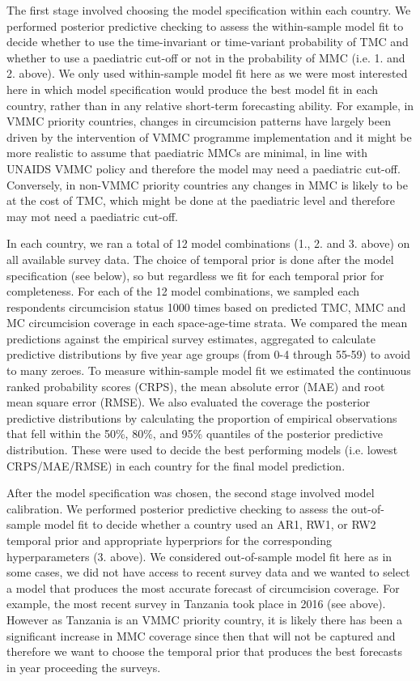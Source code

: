 \documentclass{article}
\begin{document}
\begin{appendix}
The first stage involved choosing the model specification within each country. We performed posterior predictive checking to assess the within-sample model fit to decide whether to use the time-invariant or time-variant probability of TMC and whether to use a paediatric cut-off or not in the probability of MMC (i.e. 1. and 2. above). We only used within-sample model fit here as we were most interested here in which model specification would produce the best model fit in each country, rather than in any relative short-term forecasting ability. For example, in VMMC priority countries, changes in circumcision patterns have largely been driven by the intervention of VMMC programme implementation and it might be more realistic to assume that paediatric MMCs are minimal, in line with UNAIDS VMMC policy and therefore the model may need a paediatric cut-off. Conversely, in non-VMMC priority countries any changes in MMC is likely to be at the cost of TMC, which might be done at the paediatric level and therefore may mot need a paediatric cut-off. 

In each country, we ran a total of 12 model combinations (1., 2. and 3. above) on all available survey data. The choice of temporal prior is done after the model specification (see below), so but regardless we fit for each temporal prior for completeness. For each of the 12 model combinations, we sampled each respondents circumcision status 1000 times based on predicted TMC, MMC and MC circumcision coverage in each space-age-time strata. We compared the mean predictions against the empirical survey estimates, aggregated to calculate predictive distributions by five year age groups (from 0-4 through 55-59) to avoid to many zeroes. To measure within-sample model fit we estimated the continuous ranked probability scores (CRPS), the mean absolute error (MAE) and root mean square error (RMSE). We also evaluated the coverage the posterior predictive distributions by calculating the proportion of empirical observations that fell within the 50\%, 80\%, and 95\% quantiles of the posterior predictive distribution. These were used to decide the best performing models (i.e. lowest CRPS/MAE/RMSE) in each country for the final model prediction. 

After the model specification was chosen, the second stage involved model calibration. We performed posterior predictive checking to assess the out-of-sample model fit to decide whether a country used an AR1, RW1, or RW2 temporal prior and appropriate hyperpriors for the corresponding hyperparameters (3. above). We considered out-of-sample model fit here as in some cases, we did not have access to recent survey data and we wanted to select a model that produces the most accurate forecast of circumcision coverage. For example, the most recent survey in Tanzania took place in 2016 (see above). However as Tanzania is an VMMC priority country, it is likely there has been a significant increase in MMC coverage since then that will not be captured and therefore we want to choose the temporal prior that produces the best forecasts in year proceeding the surveys. 


\end{appendix}
\end{document}
